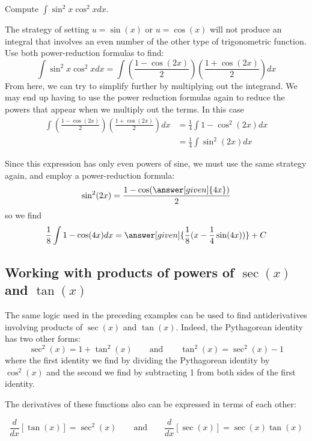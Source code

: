 \documentclass{ximera}
\begin{document}
\begin{example}
  Compute $  \int \sin^2x\cos^2xdx$.
  
  \begin{explanation} 
    The strategy of setting $u=\sin(x)$ or $u=\cos(x)$ will not produce an integral that involves an even number of the other type of trigonometric function. Use both power-reduction formulas to find:
    \[
    \int \sin^2x\cos^2xdx=\int \left( \frac{1-\cos(2x)}{2}\right)
    \left(\frac{1+\cos(2x)}{2}\right) dx
    \]
    From here, we can try to simplify further by multiplying out the integrand. We may end up having to
    use the power reduction formulas again to reduce the powers that appear when we multiply out the terms.  In this case
    \begin{align*}
      \int \left(\frac{1-\cos(2x)}{2}\right) \left( \frac{1+\cos(2x)}{2}\right) dx &= \frac{1}{4} \int 1-\cos^2(2x) dx\\
      &= \frac{1}{4} \int \sin^2(2x) dx
    \end{align*}
    
    Since this expression has only even powers of sine, we must use
    the same strategy again, and employ a power-reduction formula:
    \[
    \sin^2(2x) = \frac{1-\cos(\answer[given]{4x})}{2}
    \]
    so we find
    \[
    \frac{1}{8}\int 1-\cos(4x) dx = \answer[given]{\frac{1}{8}(x - \frac{1}{4}\sin(4x))} + C
    \]
  \end{explanation}
\end{example}




\subsection{Working with products of powers of $\sec(x)$ and $\tan(x)$}

The same logic used in the preceding examples can be used to find antiderivatives involving products of $\sec(x)$ and $\tan(x)$.  Indeed, the Pythagorean identity has two other forms:
\[
\sec^2(x) = 1 + \tan^2(x)  \qquad\text{and}\qquad \tan^2(x) = \sec^2(x) - 1  
\]
where the first identity we find by dividing the Pythagorean identity by
$\cos^2(x)$ and the second we find by subtracting 1 from both sides of the first identity. 

The derivatives of these functions also can be expressed in terms of each other:

\[
\frac{d}{dx} \left[\tan(x)\right] = \sec^2(x) \qquad\text{and}\qquad \frac{d}{dx} \left[\sec(x)\right] = \sec(x)\tan(x)
\]
\end{document}
